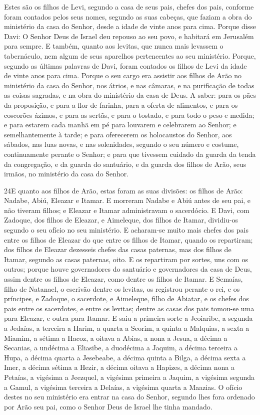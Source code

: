 Estes são os filhos de Levi, segundo a casa de seus pais, chefes
dos pais, conforme foram contados pelos seus nomes, segundo as suas
cabeças, que faziam a obra do ministério da casa do Senhor, desde a
idade de vinte anos para cima. Porque disse Davi: O Senhor
Deus de Israel deu repouso ao seu povo, e habitará em Jerusalém para
sempre. E também, quanto aos levitas, que nunca mais levassem
o tabernáculo, nem algum de seus aparelhos pertencentes ao seu
ministério. Porque, segundo as últimas palavras de Davi,
foram contados os filhos de Levi da idade de vinte anos para cima.
Porque o seu cargo era assistir aos filhos de Arão no
ministério da casa do Senhor, nos átrios, e nas câmaras, e na
purificação de todas as coisas sagradas, e na obra do ministério da
casa de Deus. A saber: para os pães da proposição, e para a
flor de farinha, para a oferta de alimentos, e para os coscorões
ázimos, e para as sertãs, e para o tostado, e para todo o peso e
medida; e para estarem cada manhã em pé para louvarem e
celebrarem ao Senhor; e semelhantemente à tarde; e para
oferecerem os holocaustos do Senhor, aos sábados, nas luas novas, e
nas solenidades, segundo o seu número e costume, continuamente
perante o Senhor; e para que tivessem cuidado da guarda da
tenda da congregação, e da guarda do santuário, e da guarda dos
filhos de Arão, seus irmãos, no ministério da casa do Senhor.

\medskip

\lettrine{24} E quanto aos filhos de Arão, estas foram as suas
divisões: os filhos de Arão: Nadabe, Abiú, Eleazar e Itamar. E
morreram Nadabe e Abiú antes de seu pai, e não tiveram filhos; e
Eleazar e Itamar administravam o sacerdócio. E Davi, com
Zadoque, dos filhos de Eleazar, e Aimeleque, dos filhos de Itamar,
dividiu-os segundo o seu ofício no seu ministério. E acharam-se
muito mais chefes dos pais entre os filhos de Eleazar do que entre
os filhos de Itamar, quando os repartiram; dos filhos de Eleazar
dezesseis chefes das casas paternas, mas dos filhos de Itamar,
segundo as casas paternas, oito. E os repartiram por sortes, uns
com os outros; porque houve governadores do santuário e governadores
da casa de Deus, assim dentre os filhos de Eleazar, como dentre os
filhos de Itamar. E Semaías, filho de Natanael, o escrivão
dentre os levitas, os registrou perante o rei, e os príncipes, e
Zadoque, o sacerdote, e Aimeleque, filho de Abiatar, e os chefes dos
pais entre os sacerdotes, e entre os levitas; dentre as casas dos
pais tomou-se uma para Eleazar, e outra para Itamar. E saiu a
primeira sorte a Jeoiaribe, a segunda a Jedaías, a terceira a
Harim, a quarta a Seorim, a quinta a Malquias, a sexta a Miamim,
a sétima a Hacoz, a oitava a Abias, a nona a Jesua, a
décima a Secanias, a undécima a Eliasibe, a duodécima a
Jaquim, a décima terceira a Hupa, a décima quarta a
Jesebeabe, a décima quinta a Bilga, a décima sexta a Imer,
a décima sétima a Hezir, a décima oitava a Hapizes, a
décima nona a Petaías, a vigésima a Jeezquel, a vigésima
primeira a Jaquim, a vigésima segunda a Gamul, a vigésima
terceira a Delaías, a vigésima quarta a Maazias. O ofício
destes no seu ministério era entrar na casa do Senhor, segundo lhes
fora ordenado por Arão seu pai, como o Senhor Deus de Israel lhe
tinha mandado.

